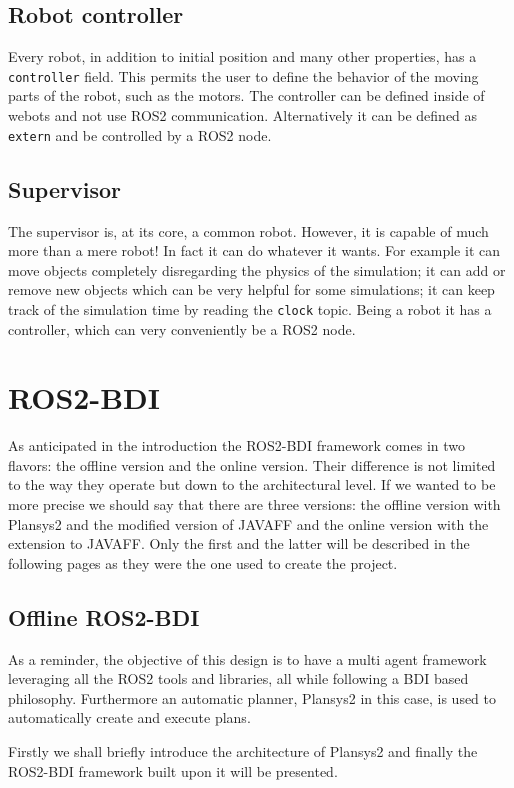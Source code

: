 \subsection{Robot controller}
Every robot, in addition to initial position and many other properties, has a \texttt{controller} field. This permits the user to define the behavior of the moving parts of the robot, such as the motors. The controller can be defined inside of webots and not use ROS2 communication. Alternatively it can be defined as \texttt{extern} and be controlled by a ROS2 node.
\subsection{Supervisor}
The supervisor is, at its core, a common robot. However, it is capable of much more than a mere robot! In fact it can do whatever it wants. For example it can move objects completely disregarding the physics of the simulation; it can add or remove new objects which can be very helpful for some simulations; it can keep track of the simulation time by reading the \texttt{clock} topic. Being a robot it has a controller, which can very conveniently be a ROS2 node.
\cite{webots_docs}
\section{ROS2-BDI}
As anticipated in the introduction the ROS2-BDI framework comes in two flavors: the offline version and the online version. Their difference is not limited to the way they operate but down to the architectural level. If we wanted to be more precise we should say that there are three versions: the offline version with Plansys2 and the modified version of JAVAFF and the online version with the extension to JAVAFF. Only the first and the latter will be described in the following pages as they were the one used to create the project.
\subsection{Offline ROS2-BDI}
As a reminder, the objective of this design is to have a multi agent framework leveraging all the ROS2 tools and libraries, all while following a BDI based philosophy. Furthermore an automatic planner, Plansys2 in this case, is used to automatically create and execute plans.  

Firstly we shall briefly introduce the architecture of Plansys2 and finally the ROS2-BDI framework built upon it will be presented. 
